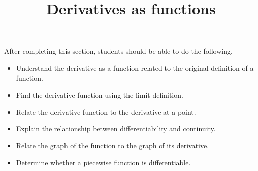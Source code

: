 \documentclass{ximera}
\title{Derivatives as functions}
\begin{document}
\begin{abstract}
\end{abstract}

\maketitle

\begin{sectionOutcomes}

After completing this section, students should be able to do the following.

\begin{itemize}
\item Understand the derivative as a function related to the original
  definition of a function.
\item Find the derivative function using the limit definition.
\item Relate the derivative function to the derivative at a point.
\item Explain the relationship between differentiability and continuity.
\item Relate the graph of the function to the graph of its derivative.
\item Determine whether a piecewise function is differentiable.
\end{itemize}

\end{sectionOutcomes}
\end{document}
